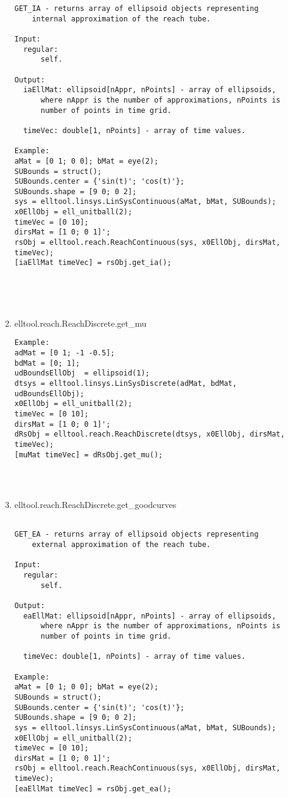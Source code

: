 \begin{enumerate}
\begin{lstlisting}
GET_IA - returns array of ellipsoid objects representing
    internal approximation of the reach tube.

Input:
  regular:
      self.

Output:
  iaEllMat: ellipsoid[nAppr, nPoints] - array of ellipsoids,
      where nAppr is the number of approximations, nPoints is
      number of points in time grid.

  timeVec: double[1, nPoints] - array of time values.

Example:
aMat = [0 1; 0 0]; bMat = eye(2);
SUBounds = struct();
SUBounds.center = {'sin(t)'; 'cos(t)'};
SUBounds.shape = [9 0; 0 2];
sys = elltool.linsys.LinSysContinuous(aMat, bMat, SUBounds);
x0EllObj = ell_unitball(2);
timeVec = [0 10];
dirsMat = [1 0; 0 1]';
rsObj = elltool.reach.ReachContinuous(sys, x0EllObj, dirsMat, timeVec);
[iaEllMat timeVec] = rsObj.get_ia();





\end{lstlisting}
\fontfamily{\familydefault}
\selectfont
\item {elltool.reach.ReachDiscrete.get\_mu}
\selectfont
\begin{lstlisting}
Example:
adMat = [0 1; -1 -0.5];
bdMat = [0; 1];
udBoundsEllObj  = ellipsoid(1);
dtsys = elltool.linsys.LinSysDiscrete(adMat, bdMat, udBoundsEllObj);
x0EllObj = ell_unitball(2);
timeVec = [0 10];
dirsMat = [1 0; 0 1]';
dRsObj = elltool.reach.ReachDiscrete(dtsys, x0EllObj, dirsMat, timeVec);
[muMat timeVec] = dRsObj.get_mu();




\end{lstlisting}
\fontfamily{\familydefault}
\selectfont
\item {elltool.reach.ReachDiscrete.get\_goodcurves}
\selectfont
\begin{lstlisting}

GET_EA - returns array of ellipsoid objects representing
    external approximation of the reach tube.

Input:
  regular:
      self.

Output:
  eaEllMat: ellipsoid[nAppr, nPoints] - array of ellipsoids,
      where nAppr is the number of approximations, nPoints is
      number of points in time grid.

  timeVec: double[1, nPoints] - array of time values.

Example:
aMat = [0 1; 0 0]; bMat = eye(2);
SUBounds = struct();
SUBounds.center = {'sin(t)'; 'cos(t)'};
SUBounds.shape = [9 0; 0 2];
sys = elltool.linsys.LinSysContinuous(aMat, bMat, SUBounds);
x0EllObj = ell_unitball(2);
timeVec = [0 10];
dirsMat = [1 0; 0 1]';
rsObj = elltool.reach.ReachContinuous(sys, x0EllObj, dirsMat, timeVec);
[eaEllMat timeVec] = rsObj.get_ea();


\end{lstlisting}
\end{enumerate}
